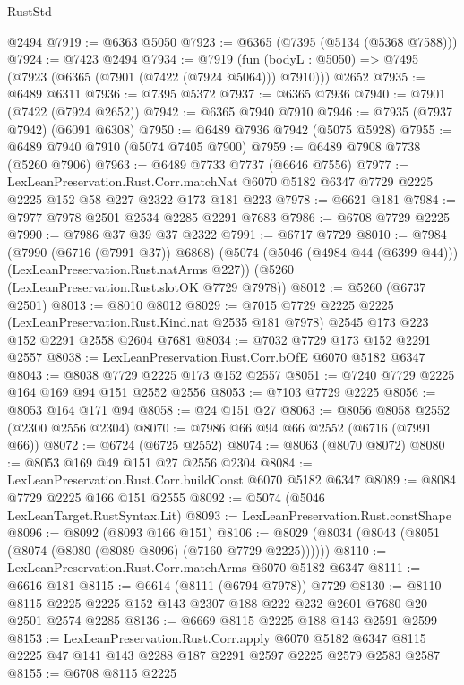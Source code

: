 \begin{lexlean}{RustStd}
\begin{coremodule}
    @2494
@7919 := @6363 @5050
@7923 := @6365 (@7395 (@5134 (@5368 @7588)))
@7924 := @7423 @2494
@7934 := @7919
    (fun (bodyL : @5050) => @7495 (@7923 (@6365 (@7901 (@7422 (@7924 @5064))) @7910)))
    @2652
@7935 := @6489 @6311
@7936 := @7395 @5372
@7937 := @6365 @7936
@7940 := @7901 (@7422 (@7924 @2652))
@7942 := @6365 @7940 @7910
@7946 := @7935 (@7937 @7942) (@6091 @6308)
@7950 := @6489 @7936 @7942 (@5075 @5928)
@7955 := @6489 @7940 @7910 (@5074 @7405 @7900)
@7959 := @6489 @7908 @7738 (@5260 @7906)
@7963 := @6489 @7733 @7737 (@6646 @7556)
@7977 := LexLeanPreservation.Rust.Corr.matchNat
    @6070
    @5182
    @6347
    @7729
    @2225
    @2225
    @152
    @58
    @227
    @2322
    @173
    @181
    @223
@7978 := @6621 @181
@7984 := @7977 @7978 @2501 @2534 @2285 @2291 @7683
@7986 := @6708 @7729 @2225
@7990 := @7986 @37 @39 @37 @2322
@7991 := @6717 @7729
@8010 := @7984
    (@7990 (@6716 (@7991 @37)) @6868)
    (@5074 (@5046 (@4984 @44 (@6399 @44))) (LexLeanPreservation.Rust.natArms @227))
    (@5260 (LexLeanPreservation.Rust.slotOK @7729 @7978))
@8012 := @5260 (@6737 @2501)
@8013 := @8010 @8012
@8029 := @7015
    @7729
    @2225
    @2225
    (LexLeanPreservation.Rust.Kind.nat @2535 @181 @7978)
    @2545
    @173
    @223
    @152
    @2291
    @2558
    @2604
    @7681
@8034 := @7032 @7729 @173 @152 @2291 @2557
@8038 := LexLeanPreservation.Rust.Corr.bOfE @6070 @5182 @6347
@8043 := @8038 @7729 @2225 @173 @152 @2557
@8051 := @7240 @7729 @2225 @164 @169 @94 @151 @2552 @2556
@8053 := @7103 @7729 @2225
@8056 := @8053 @164 @171 @94
@8058 := @24 @151 @27
@8063 := @8056 @8058 @2552 (@2300 @2556 @2304)
@8070 := @7986 @66 @94 @66 @2552 (@6716 (@7991 @66))
@8072 := @6724 (@6725 @2552)
@8074 := @8063 (@8070 @8072)
@8080 := @8053 @169 @49 @151 @27 @2556 @2304
@8084 := LexLeanPreservation.Rust.Corr.buildConst @6070 @5182 @6347
@8089 := @8084 @7729 @2225 @166 @151 @2555
@8092 := @5074 (@5046 LexLeanTarget.RustSyntax.Lit)
@8093 := LexLeanPreservation.Rust.constShape
@8096 := @8092 (@8093 @166 @151)
@8106 := @8029 (@8034 (@8043 (@8051 (@8074 (@8080 (@8089 @8096) (@7160 @7729 @2225))))))
@8110 := LexLeanPreservation.Rust.Corr.matchArms @6070 @5182 @6347
@8111 := @6616 @181
@8115 := @6614 (@8111 (@6794 @7978)) @7729
@8130 := @8110 @8115 @2225 @2225 @152 @143 @2307 @188 @222 @232 @2601 @7680 @20 @2501 @2574 @2285
@8136 := @6669 @8115 @2225 @188 @143 @2591 @2599
@8153 := LexLeanPreservation.Rust.Corr.apply
    @6070
    @5182
    @6347
    @8115
    @2225
    @47
    @141
    @143
    @2288
    @187
    @2291
    @2597
    @2225
    @2579
    @2583
    @2587
@8155 := @6708 @8115 @2225

\end{coremodule}
\end{lexlean}
